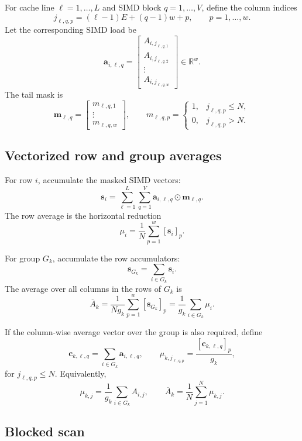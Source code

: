 \documentclass{article}
\begin{document}
For cache line \(\ell=1,\dots,L\) and SIMD block \(q=1,\dots,V\), define the
column indices
\[
  j_{\ell,q,p}
  =
  (\ell-1)E+(q-1)w+p,
  \qquad
  p=1,\dots,w.
\]
Let the corresponding SIMD load be
\[
  \mathbf{a}_{i,\ell,q}
  =
  \begin{bmatrix}
    A_{i,j_{\ell,q,1}}\\
    A_{i,j_{\ell,q,2}}\\
    \vdots\\
    A_{i,j_{\ell,q,w}}
  \end{bmatrix}
  \in \mathbb{R}^{w}.
\]
The tail mask is
\[
  \mathbf{m}_{\ell,q}
  =
  \begin{bmatrix}
    m_{\ell,q,1}\\
    \vdots\\
    m_{\ell,q,w}
  \end{bmatrix},
  \qquad
  m_{\ell,q,p}
  =
  \begin{cases}
    1, & j_{\ell,q,p}\le N,\\
    0, & j_{\ell,q,p}>N.
  \end{cases}
\]

\subsection*{Vectorized row and group averages}

For row \(i\), accumulate the masked SIMD vectors:
\[
  \mathbf{s}_i
  =
  \sum_{\ell=1}^{L}\sum_{q=1}^{V}
  \mathbf{a}_{i,\ell,q}\odot \mathbf{m}_{\ell,q}.
\]
The row average is the horizontal reduction
\[
  \mu_i
  =
  \frac{1}{N}
  \sum_{p=1}^{w}[\mathbf{s}_i]_p.
\]

For group \(G_k\), accumulate the row accumulators:
\[
  \mathbf{s}_{G_k}
  =
  \sum_{i\in G_k}\mathbf{s}_i.
\]
The average over all columns in the rows of \(G_k\) is
\[
  \overline{A}_k
  =
  \frac{1}{N g_k}
  \sum_{p=1}^{w}[\mathbf{s}_{G_k}]_p
  =
  \frac{1}{g_k}\sum_{i\in G_k}\mu_i.
\]

If the column-wise average vector over the group is also required, define
\[
  \mathbf{c}_{k,\ell,q}
  =
  \sum_{i\in G_k}\mathbf{a}_{i,\ell,q},
  \qquad
  \mu_{k,j_{\ell,q,p}}
  =
  \frac{[\mathbf{c}_{k,\ell,q}]_p}{g_k},
\]
for \(j_{\ell,q,p}\le N\).  Equivalently,
\[
  \mu_{k,j}
  =
  \frac{1}{g_k}\sum_{i\in G_k}A_{i,j},
  \qquad
  \overline{A}_k
  =
  \frac{1}{N}\sum_{j=1}^{N}\mu_{k,j}.
\]

\subsection*{Blocked scan}
\end{document}
